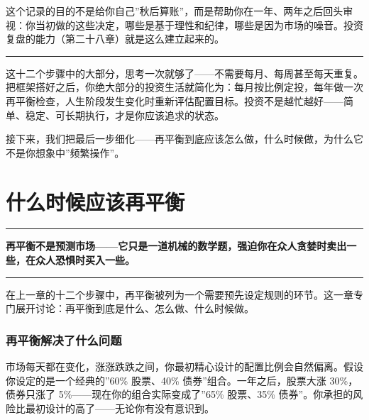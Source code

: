 \documentclass[a4paper,11pt,oneside,fontset=none,UTF8,zihao=-4]{ctexbook}
\begin{document}
这个记录的目的不是给你自己''秋后算账''，而是帮助你在一年、两年之后回头审视：你当初做的这些决定，哪些是基于理性和纪律，哪些是因为市场的噪音。投资复盘的能力（第二十八章）就是这么建立起来的。

\begin{center}{\color{dh-bronze}\rule{0.2\textwidth}{0.5pt}}\end{center}

这十二个步骤中的大部分，思考一次就够了------不需要每月、每周甚至每天重复。把框架搭好之后，你绝大部分的投资生活就简化为：每月按比例定投，每年做一次再平衡检查，人生阶段发生变化时重新评估配置目标。投资不是越忙越好------简单、稳定、可长期执行，才是你应该追求的状态。

接下来，我们把最后一步细化------再平衡到底应该怎么做，什么时候做，为什么它不是你想象中''频繁操作''。

\newpage

\chapter{什么时候应该再平衡}\label{ux4ec0ux4e48ux65f6ux5019ux5e94ux8be5ux518dux5e73ux8861}

\begin{center}{\color{dh-bronze}\rule{0.2\textwidth}{0.5pt}}\end{center}

\begin{dhquote}
\textbf{再平衡不是预测市场------它只是一道机械的数学题，强迫你在众人贪婪时卖出一些，在众人恐惧时买入一些。}
\end{dhquote}

\begin{center}{\color{dh-bronze}\rule{0.2\textwidth}{0.5pt}}\end{center}

在上一章的十二个步骤中，再平衡被列为一个需要预先设定规则的环节。这一章专门展开讨论：再平衡到底是什么、怎么做、什么时候做。

\subsection{再平衡解决了什么问题}\label{ux518dux5e73ux8861ux89e3ux51b3ux4e86ux4ec0ux4e48ux95eeux9898}

市场每天都在变化，涨涨跌跌之间，你最初精心设计的配置比例会自然偏离。假设你设定的是一个经典的''60\%
股票、40\% 债券''组合。一年之后，股票大涨 30\%，债券只涨了
5\%------现在你的组合实际变成了''65\% 股票、35\%
债券''。你承担的风险比最初设计的高了------无论你有没有意识到。
\end{document}
